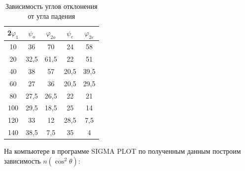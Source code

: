 \documentclass[a4paper,12pt]{article}
\begin{document}
\begin{table}[h]
\begin{center}
\caption{Зависимость углов отклонения от угла падения}
\begin{tabular}{|c|c|c|c|c|}
\hline
2$\varphi_1$ & $\psi_o$ & $\varphi_{2o}$ & $\psi_e$    & $\varphi_{2e} $\\ \hline
10                         & 36                     & 70                           & 24 						& 58                           \\ \hline
20                         & 32,5                   & 61,5                         & 22                        & 51                           \\ \hline
40                         & 38                     & 57                           & 20,5                      & 39,5                         \\ \hline
60                         & 27                     & 36                           & 20,5                      & 29,5                         \\ \hline
80                         & 27,5                   & 26,5                         & 22                        & 21                           \\ \hline
100                        & 29,5                   & 18,5                         & 25                        & 14                           \\ \hline
120                        & 33                     & 12                           & 28,5                      & 7,5                          \\ \hline
140                        & 38,5                   & 7,5                          & 35                        & 4                            \\ \hline
\end{tabular}
\end{center}
\end{table}

На компьютере в программе SIGMA PLOT по полученным данным построим зависимость $n(\cos^2 \theta)$:
\end{document}
